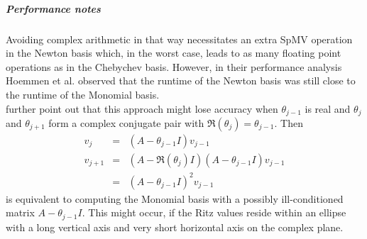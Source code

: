 \documentclass{scrartcl}
\numberwithin{equation}{section}
\begin{document}
\subparagraph{Performance notes}
Avoiding complex arithmetic in that way necessitates an extra SpMV operation in the Newton basis which, in the worst case, leads to as many floating point operations as in the Chebychev basis. However, in their performance analysis Hoemmen et al. \cite{Hoemmen:2010:CKS:1970638} observed that the runtime of the Newton basis was still close to the runtime of the Monomial basis. \\
\cite{Hoemmen:2010:CKS:1970638} further point out that this approach might lose accuracy when $\theta_{j - 1}$ is real and $\theta_j$ and $\theta_{j + 1}$ form a complex conjugate pair with $\Re(\theta_j) = \theta_{j - 1} $. Then
\begin{eqnarray*}
v_j &=& (A - \theta_{j - 1} I )v_{j - 1} \\
v_{j + 1} &=& (A - \Re(\theta_j) I )(A - \theta_{j - 1} I )v_{j - 1} \\
		  &=& (A - \theta_{j - 1} I )^2v_{j - 1}
\end{eqnarray*}
is equivalent to computing the Monomial basis with a possibly ill-conditioned  matrix $A - \theta_{j - 1} I$. This might occur, if the Ritz values reside within an ellipse with a long vertical axis and very short horizontal axis on the complex plane.
\end{document}
